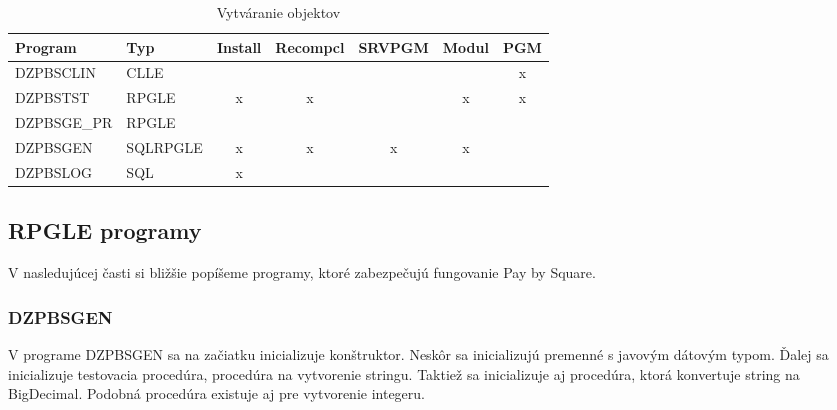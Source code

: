 \begin{table}[ht!]
\caption{Vytváranie objektov}
\label{tab:vytvaranie objektov}
\begin{tabular}{|l|l|c|c|c|c|c|}
\hline
\textbf{Program} & \textbf{Typ} & \multicolumn{1}{l|}{\textbf{Install}} & \multicolumn{1}{l|}{\textbf{Recompcl}} & \multicolumn{1}{l|}{\textbf{SRVPGM}} & \multicolumn{1}{l|}{\textbf{Modul}} & \multicolumn{1}{l|}{\textbf{PGM}} \\ \hline
DZPBSCLIN        & CLLE         &                                       &                                        &                                      &                                     & x                                 \\ \hline
DZPBSTST         & RPGLE        & x                                     & x                                      &                                      & x                                   & x                                 \\ \hline
DZPBSGE\_PR      & RPGLE        &                                       &                                        &                                      &                                     &                                   \\ \hline
DZPBSGEN         & SQLRPGLE     & x                                     & x                                      & x                                    & x                                   &                                   \\ \hline
DZPBSLOG         & \acs{SQL}          & x                               &                                        &                                      &                                     &                                   \\ \hline
\end{tabular}
\end{table}

\subsection{\acs{RPG}LE programy}
V nasledujúcej časti si bližšie popíšeme programy, ktoré zabezpečujú fungovanie Pay by Square.

\subsubsection{DZPBSGEN}

V programe DZPBSGEN sa na začiatku inicializuje konštruktor. Neskôr sa inicializujú premenné s javovým dátovým typom. Ďalej sa inicializuje testovacia procedúra, procedúra na vytvorenie stringu. Taktiež sa inicializuje aj procedúra, ktorá konvertuje string na BigDecimal. Podobná procedúra existuje aj pre vytvorenie integeru. 

